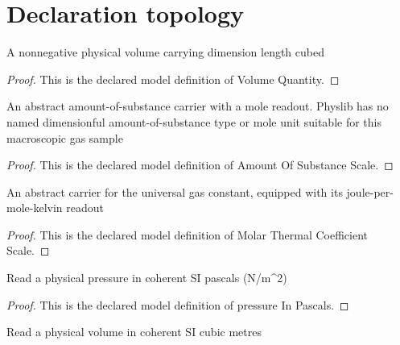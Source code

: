 \section{Declaration topology}
\begin{definition}
  \label{def:physics:phyx-mini-0495:phyxminiproblems-problemphyxmini0495-volumequantity}
  A nonnegative physical volume carrying dimension length cubed
\end{definition}
\begin{proof}
  This is the declared model definition of Volume Quantity.
\end{proof}
\begin{definition}
  \label{def:physics:phyx-mini-0495:phyxminiproblems-problemphyxmini0495-amountofsubstancescale}
  An abstract amount-of-substance carrier with a mole readout. Physlib has no named dimensionful amount-of-substance type or mole unit suitable for this macroscopic gas sample
\end{definition}
\begin{proof}
  This is the declared model definition of Amount Of Substance Scale.
\end{proof}
\begin{definition}
  \label{def:physics:phyx-mini-0495:phyxminiproblems-problemphyxmini0495-molarthermalcoefficientscale}
  An abstract carrier for the universal gas constant, equipped with its joule-per-mole-kelvin readout
\end{definition}
\begin{proof}
  This is the declared model definition of Molar Thermal Coefficient Scale.
\end{proof}
\begin{definition}
  \label{def:physics:phyx-mini-0495:phyxminiproblems-problemphyxmini0495-pressureinpascals}
  Read a physical pressure in coherent SI pascals (N/m\textasciicircum{}2)
\end{definition}
\begin{proof}
  This is the declared model definition of pressure In Pascals.
\end{proof}
\begin{definition}
  \label{def:physics:phyx-mini-0495:phyxminiproblems-problemphyxmini0495-volumeincubicmetres}
  Read a physical volume in coherent SI cubic metres
\end{definition}
